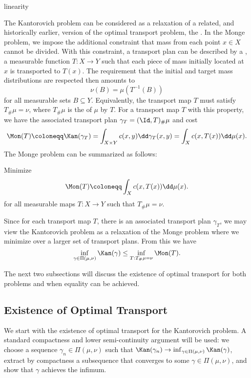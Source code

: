 \documentclass[oneside,reqno,letterpaper]{amsart}
\begin{document}
\begin{itodo}
  linearity
\end{itodo}


The Kantorovich problem can be considered as a relaxation of a related, and historically earlier, version of the optimal transport problem, the .
In the Monge problem, we impose the additional constraint that mass from each point \(x \in X\) cannot be divided.
With this constraint, a transport plan can be described by a , a measurable function \(T: X \to Y\) such that each piece of mass initially located at \(x\) is transported to \(T(x)\).
The requirement that the initial and target mass distributions are respected then amounts to
\[
  \nu(B) = \mu(T^{-1}(B))
\]
for all measurable sets \(B \subseteq Y\).
Equivalently, the transport map \(T\) must satisfy \(T_\# \mu = \nu\), where \(T_\# \mu\) is the  of \(\mu\) by \(T\).
For a transport map \(T\) with this property, we have the associated transport plan \(\gamma_T = (\Id, T)_\# \mu\) and cost
\[
  \Mon(T)
  \coloneqq \Kan(\gamma_T)
  = \int_{X \times Y} c(x, y) \dd \gamma_T(x, y)
  = \int_{X} c(x, T(x)) \dd \mu(x).
\]
The Monge problem can be summarized as follows:
\begin{problem*}[Monge]
  Minimize
  \[
    \Mon(T)
    \coloneqq \int_{X} c(x, T(x)) \dd \mu(x).
  \]
  for all measurable maps \(T: X \to Y\) such that \(T_\# \mu = \nu\).
\end{problem*}


Since for each transport map \(T\), there is an associated transport plan \(\gamma_T\), we may view the Kantorovich problem as a relaxation of the Monge problem where we minimize over a larger set of transport plans.
From this we have
\[
  \inf_{\gamma \in \Pi(\mu, \nu)} \Kan(\gamma)
  \leq \inf_{T: T_\# \mu = \nu} \Mon(T).
\]

The next two subsections will discuss the existence of optimal transport for both problems and when equality can be achieved.


\subsection{Existence of Optimal Transport}
We start with the existence of optimal transport for the Kantorovich problem.
A standard compactness and lower semi-continuity argument will be used:
we choose a sequence \(\gamma_n \in \Pi(\mu, \nu)\) such that \(\Kan(\gamma_n) \to \inf_{\gamma \in \Pi(\mu, \nu)} \Kan(\gamma)\), extract by compactness a subsequence that converges to some \(\gamma \in \Pi(\mu, \nu)\), and show that \(\gamma\) achieves the infimum.
\end{document}
